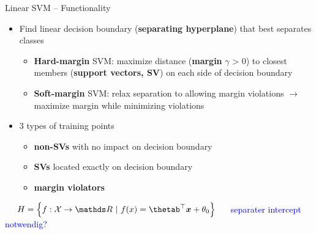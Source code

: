 \begin{vbframe}{Linear SVM -- Functionality}

   
\medskip


\begin{itemize}
  \item Find linear decision boundary (\textbf{separating hyperplane}) that 
  best separates classes
  \begin{itemize}
    \item \textbf{Hard-margin} SVM: maximize distance (\textbf{margin} 
    $\gamma$ > 0) to closest members (\textbf{support vectors, SV}) on each 
    side of decision boundary
    \item \textbf{Soft-margin} SVM: relax separation to allowing margin 
    violations $\rightarrow$ maximize margin while minimizing violations
  \end{itemize}
  \item 3 types of training points
  \begin{itemize}
    \item \textbf{non-SVs} with no impact on decision boundary
    \item \textbf{SVs} located exactly on decision boundary
    \item \textbf{margin violators}
  \end{itemize}
\end{itemize}

\medskip

 ~~
$\Hspace = \left\{f: \Xspace \to \R ~|~\fx = \thetab^\top \xv + \theta_0\right\}$
 ~~ \textcolor{blue}{separater intercept notwendig?}

\framebreak


\end{vbframe}
